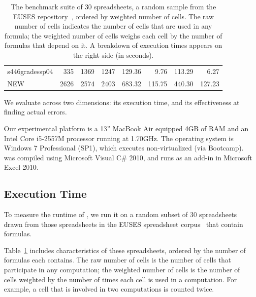 \begin{table}[!t]
\begin{tabular}{l|rrr||r|rrr}
\small{s446gradessp04} & \small{335} & \small{1369} & \small{1247} & \small{129.36} & \small{9.76} & \small{113.29} & \small{6.27} \\ 
\small{NEW} & \small{2626} & \small{2574} & \small{2403} & \small{683.32} & \small{115.75} & \small{440.30} & \small{127.23} \\ 
    \end{tabular}%
  \caption{The benchmark suite of 30 spreadsheets, a random sample from the EUSES repository~\cite{Fisher:2005:ESC:1082983.1083242}, ordered by weighted number of cells. The raw number of cells indicates the number of cells that are used in any formula; the weighted number of cells weighs each cell by the number of formulas that depend on it. A breakdown of \checkcell{} execution times appears on the right side (in seconds).\label{tab:spreadsheet_characteristics}}
\end{table}

We evaluate \checkcell{} across two dimensions: its execution time,
and its effectiveness at finding actual errors.

Our experimental platform is a 13'' MacBook Air equipped 4GB of RAM
and an Intel Core i5-2557M processor running at 1.70GHz. The operating
system is Windows 7 Professional (SP1), which executes non-virtualized
(via Bootcamp). \checkcell{} was compiled using Microsoft Visual C\#
2010, and runs as an add-in in Microsoft Excel 2010.

\subsection{Execution Time}
\label{sec:execution_time}

To measure the runtime of \checkcell{}, we run it on a random subset
of 30 spreadsheets drawn from those spreadsheets in the EUSES
spreadsheet corpus~\cite{Fisher:2005:ESC:1082983.1083242} that contain
formulas.

Table~\ref{tab:spreadsheet_characteristics} includes
characteristics of these spreadsheets, ordered by the number of
formulas each contains. The raw number of cells is the number of cells
that participate in any computation; the weighted number of cells is
the number of cells weighted by the number of times each cell is used
in a computation. For example, a cell that is involved in two
computations is counted twice.

